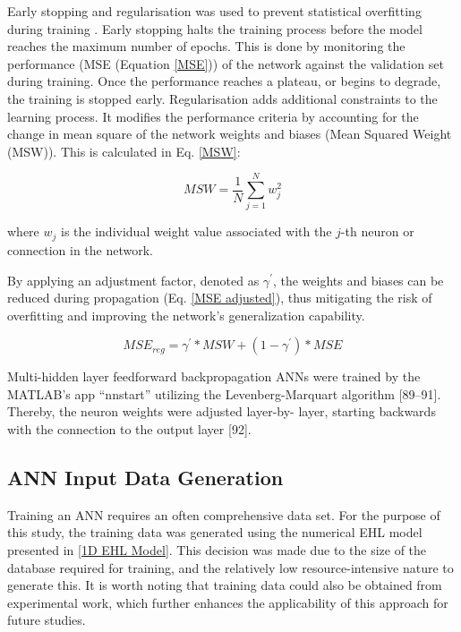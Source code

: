 Early stopping and regularisation was used to prevent statistical overfitting during training \cite{MatlabOverfit}. Early stopping halts the training process before the model reaches the maximum number of epochs. This is done by monitoring the performance (MSE (Equation \ref{MSE})) of the network against the validation set during training. Once the performance reaches a plateau, or begins to degrade, the training is stopped early. Regularisation adds additional constraints to the learning process. It modifies the performance criteria by accounting for the change in mean square of the network weights and biases (Mean Squared Weight (MSW)). This is calculated in Eq. \ref{MSW}: 

\begin{equation}\label{MSW}
	M S W=\frac{1}{N} \sum_{j=1}^N w_j^2
\end{equation}

where $w_j$ is the individual weight value associated with the $j$-th neuron or connection in the network.

By applying an adjustment factor, denoted as $\gamma^{\prime}$, the weights and biases can be reduced during propagation (Eq. \ref{MSE adjusted}), thus mitigating the risk of overfitting and improving the network's generalization capability.

\begin{equation}\label{MSE adjusted}
	M S E_{r e g}=\gamma^{\prime} * M S W+\left(1-\gamma^{\prime}\right) * M S E
\end{equation}

Multi-hidden layer
feedforward
backpropagation
ANNs were trained by the MATLAB’s app “nnstart”
utilizing the Levenberg-Marquart algorithm [89–91].
Thereby, the neuron weights were adjusted layer-by-
layer, starting backwards with the connection to the
output layer [92].


\subsection{ANN Input Data Generation}

Training an ANN requires an often comprehensive data set. For the purpose of this study, the training data was generated using the numerical EHL model presented in \ref{1D EHL Model}. This decision was made due to the size of the database required for training, and the relatively low resource-intensive nature to generate this. It is worth noting that training data could also be obtained from experimental work, which further enhances the applicability of this approach for future studies.

